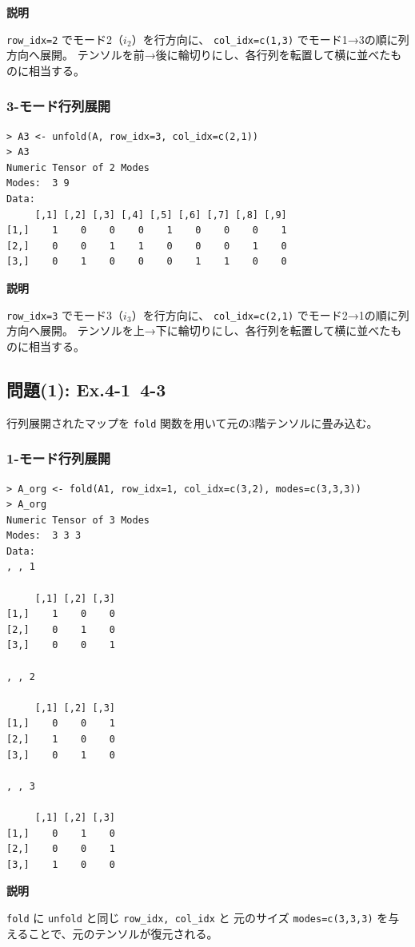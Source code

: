 \documentclass[12pt,a4paper]{ltjsarticle}
\begin{document}
\newpage
\textbf{説明}

\texttt{row\_idx=2} でモード2（$i_2$）を行方向に、
\texttt{col\_idx=c(1,3)} でモード1→3の順に列方向へ展開。
テンソルを前→後に輪切りにし、各行列を転置して横に並べたものに相当する。

\subsubsection{3-モード行列展開}
\begin{lstlisting}
> A3 <- unfold(A, row_idx=3, col_idx=c(2,1))
> A3
Numeric Tensor of 2 Modes
Modes:  3 9
Data:
     [,1] [,2] [,3] [,4] [,5] [,6] [,7] [,8] [,9]
[1,]    1    0    0    0    1    0    0    0    1
[2,]    0    0    1    1    0    0    0    1    0
[3,]    0    1    0    0    0    1    1    0    0
\end{lstlisting}

\textbf{説明}

\texttt{row\_idx=3} でモード3（$i_3$）を行方向に、
\texttt{col\_idx=c(2,1)} でモード2→1の順に列方向へ展開。
テンソルを上→下に輪切りにし、各行列を転置して横に並べたものに相当する。

\subsection{問題(1): Ex.4-1~4-3}\label{subsec:exercise4}

行列展開されたマップを \texttt{fold} 関数を用いて元の3階テンソルに畳み込む。

\subsubsection{1-モード行列展開}
\begin{lstlisting}
> A_org <- fold(A1, row_idx=1, col_idx=c(3,2), modes=c(3,3,3))
> A_org
Numeric Tensor of 3 Modes
Modes:  3 3 3
Data:
, , 1

     [,1] [,2] [,3]
[1,]    1    0    0
[2,]    0    1    0
[3,]    0    0    1

, , 2

     [,1] [,2] [,3]
[1,]    0    0    1
[2,]    1    0    0
[3,]    0    1    0

, , 3

     [,1] [,2] [,3]
[1,]    0    1    0
[2,]    0    0    1
[3,]    1    0    0
\end{lstlisting}

\textbf{説明}

\texttt{fold} に \texttt{unfold} と同じ \texttt{row\_idx, col\_idx} と
元のサイズ \texttt{modes=c(3,3,3)} を与えることで、元のテンソルが復元される。
\end{document}
